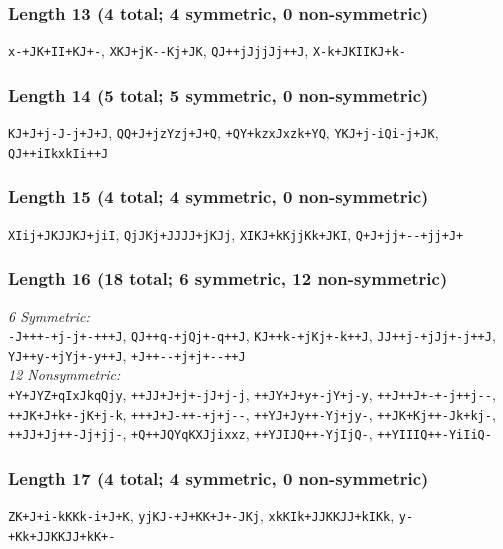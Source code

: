\documentclass[12pt]{article}
\numberwithin{equation}{section}
\begin{document}
\subsubsection*{Length 13 (4 total; 4 symmetric, 0 non-symmetric)}
\raggedright
\verb|x-+JK+II+KJ+-|, \verb|XKJ+jK--Kj+JK|, \verb|QJ++jJjjJj++J|, \verb|X-k+JKIIKJ+k-|
\subsubsection*{Length 14 (5 total; 5 symmetric, 0 non-symmetric)}
\raggedright
\verb|KJ+J+j-J-j+J+J|, \verb|QQ+J+jzYzj+J+Q|, \verb|+QY+kzxJxzk+YQ|, \verb|YKJ+j-iQi-j+JK|, \verb|QJ++iIkxkIi++J|
\subsubsection*{Length 15 (4 total; 4 symmetric, 0 non-symmetric)}
\raggedright
\verb|XIij+JKJJKJ+jiI|, \verb|QjJKj+JJJJ+jKJj|, \verb|XIKJ+kKjjKk+JKI|, \verb|Q+J+jj+--+jj+J+|
\subsubsection*{Length 16 (18 total; 6 symmetric, 12 non-symmetric)}
\raggedright
\emph{6 Symmetric:}\\
\verb|-J+++-+j-j+-+++J|, \verb|QJ++q-+jQj+-q++J|, \verb|KJ++k-+jKj+-k++J|, \verb|JJ++j-+jJj+-j++J|, \verb|YJ++y-+jYj+-y++J|, \verb|+J++--+j+j+--++J|
\\[0.5\baselineskip]
\emph{12 Nonsymmetric:}\\
\verb|+Y+JYZ+qIxJkqQjy|, \verb|++JJ+J+j+-jJ+j-j|, \verb|++JY+J+y+-jY+j-y|, \verb|++J++J+-+-j++j--|, \verb|++JK+J+k+-jK+j-k|, \verb|+++J+J-++-+j+j--|, \verb|++YJ+Jy++-Yj+jy-|, \verb|++JK+Kj++-Jk+kj-|, \verb|++JJ+Jj++-Jj+jj-|, \verb|+Q++JQYqKXJjixxz|, \verb|++YJIJQ++-YjIjQ-|, \verb|++YIIIQ++-YiIiQ-|\\
\subsubsection*{Length 17 (4 total; 4 symmetric, 0 non-symmetric)}
\raggedright
\verb|ZK+J+i-kKKk-i+J+K|, \verb|yjKJ-+J+KK+J+-JKj|, \verb|xkKIk+JJKKJJ+kIKk|, \verb|y-+Kk+JJKKJJ+kK+-|
\end{document}

